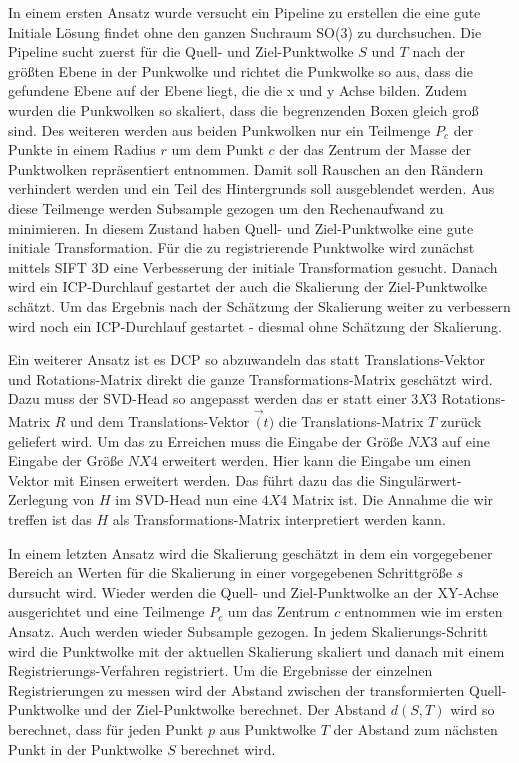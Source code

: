 \documentclass[12pt,titlepage, twoside]{article}
\begin{document}
In einem ersten Ansatz wurde versucht ein Pipeline zu erstellen die eine gute Initiale Lösung findet ohne den ganzen Suchraum SO(3) zu durchsuchen.
Die Pipeline sucht zuerst für die Quell- und Ziel-Punktwolke $S$ und $T$ nach der größten Ebene in der Punkwolke und richtet die Punkwolke so aus, dass die gefundene Ebene auf der Ebene liegt, die die x und y Achse bilden.
Zudem wurden die Punkwolken so skaliert, dass die begrenzenden Boxen gleich groß sind.
Des weiteren werden aus beiden Punkwolken nur ein Teilmenge $P_c$ der Punkte in einem Radius $r$ um dem Punkt $c$ der das Zentrum der Masse der Punktwolken repräsentiert entnommen.
Damit soll Rauschen an den Rändern verhindert werden und ein Teil des Hintergrunds soll ausgeblendet werden.
Aus diese Teilmenge werden Subsample gezogen um den Rechenaufwand zu minimieren. In diesem Zustand haben Quell- und Ziel-Punktwolke eine gute initiale Transformation.
Für die zu registrierende Punktwolke wird zunächst mittels SIFT 3D \cite{Sift3D} eine Verbesserung der initiale Transformation gesucht. Danach wird ein ICP-Durchlauf gestartet der auch die Skalierung der Ziel-Punktwolke schätzt.
Um das Ergebnis nach der Schätzung der Skalierung weiter zu verbessern wird noch ein ICP-Durchlauf gestartet - diesmal ohne Schätzung der Skalierung.

Ein weiterer Ansatz ist es DCP so abzuwandeln das statt Translations-Vektor und Rotations-Matrix direkt die ganze Transformations-Matrix geschätzt wird. 
Dazu muss der SVD-Head so angepasst werden das er statt einer $3X3$ Rotations-Matrix $R$ und dem Translations-Vektor $\vec(t)$ die Translations-Matrix $T$ zurück geliefert wird.
Um das zu Erreichen muss die Eingabe der Größe $NX3$ auf eine Eingabe der Größe $NX4$ erweitert werden. Hier kann die Eingabe um einen Vektor mit Einsen erweitert werden.
Das führt dazu das die Singulärwert-Zerlegung von $H$ im SVD-Head nun eine $4X4$ Matrix ist. Die Annahme die wir treffen ist das $H$ als Transformations-Matrix interpretiert werden kann.

In einem letzten Ansatz wird die Skalierung geschätzt in dem ein vorgegebener Bereich an Werten für die Skalierung in einer vorgegebenen Schrittgröße $s$ dursucht wird.
Wieder werden die Quell- und Ziel-Punktwolke an der XY-Achse ausgerichtet und eine Teilmenge $P_c$ um das Zentrum $c$ entnommen wie im ersten Ansatz. Auch werden wieder Subsample gezogen.
In jedem Skalierungs-Schritt wird die Punktwolke mit der aktuellen Skalierung skaliert und danach mit einem Registrierungs-Verfahren registriert.
Um die Ergebnisse der einzelnen Registrierungen zu messen wird der Abstand zwischen der transformierten Quell-Punktwolke und der Ziel-Punktwolke berechnet. 
Der Abstand $d(S,T)$ wird so berechnet, dass für jeden Punkt $p$ aus Punktwolke $T$ der Abstand zum nächsten Punkt in der Punktwolke $S$ berechnet wird.
\end{document}
